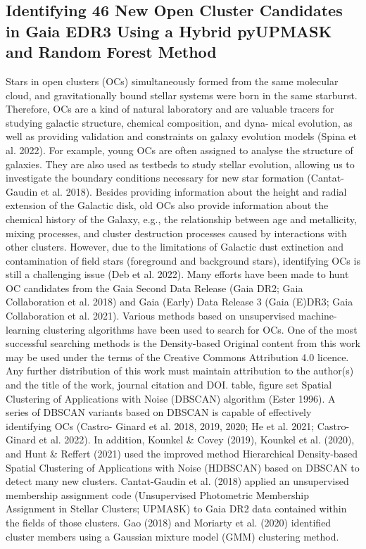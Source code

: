 \documentclass[../Main.tex]{subfiles}
\begin{document}
\subsection{Identifying 46 New Open Cluster Candidates in Gaia EDR3 Using a Hybrid pyUPMASK and Random Forest Method} %

Stars in open clusters (OCs) simultaneously formed from the same molecular cloud, and gravitationally bound stellar systems were born in the same starburst. Therefore, OCs are a kind of natural laboratory and are valuable tracers for studying galactic structure, chemical composition, and dyna- mical evolution, as well as providing validation and constraints on galaxy evolution models (Spina et al. 2022). For example, young OCs are often assigned to analyse the structure of galaxies. They are also used as testbeds to study stellar evolution, allowing us to investigate the boundary conditions necessary for new star formation (Cantat-Gaudin et al. 2018). Besides providing information about the height and radial extension of the Galactic disk, old OCs also provide information about the chemical history of the Galaxy, e.g., the relationship between age and metallicity, mixing processes, and cluster destruction processes caused by interactions with other clusters.
However, due to the limitations of Galactic dust extinction and contamination of field stars (foreground and background stars), identifying OCs is still a challenging issue (Deb et al. 2022). Many efforts have been made to hunt OC candidates from the Gaia Second Data Release (Gaia DR2; Gaia Collaboration et al. 2018) and Gaia (Early) Data Release 3 (Gaia (E)DR3; Gaia Collaboration et al. 2021).
Various methods based on unsupervised machine-learning clustering algorithms have been used to search for OCs. One of the most successful searching methods is the Density-based
Original content from this work may be used under the terms
of the Creative Commons Attribution 4.0 licence. Any further distribution of this work must maintain attribution to the author(s) and the title of the work, journal citation and DOI.
table, figure set
Spatial Clustering of Applications with Noise (DBSCAN) algorithm (Ester 1996). A series of DBSCAN variants based on DBSCAN is capable of effectively identifying OCs (Castro- Ginard et al. 2018, 2019, 2020; He et al. 2021; Castro-Ginard et al. 2022). In addition, Kounkel & Covey (2019), Kounkel et al. (2020), and Hunt & Reffert (2021) used the improved method Hierarchical Density-based Spatial Clustering of Applications with Noise (HDBSCAN) based on DBSCAN to detect many new clusters. Cantat-Gaudin et al. (2018) applied an unsupervised membership assignment code (Unsupervised Photometric Membership Assignment in Stellar Clusters; UPMASK) to Gaia DR2 data contained within the fields of those clusters. Gao (2018) and Moriarty et al. (2020) identified cluster members using a Gaussian mixture model (GMM) clustering method.
\end{document}
